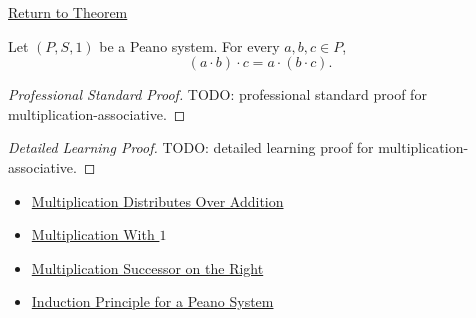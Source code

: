 \newpage
{}
\label{prf:multiplication-associative}

\begin{remark*}[Return]
\hyperref[thm:multiplication-associative]{Return to Theorem}
\end{remark*}

\begin{theorem*}
Let $(P,S,1)$ be a Peano system. For every $a,b,c \in P$,
\[
(a \cdot b) \cdot c = a \cdot (b \cdot c).
\]
\end{theorem*}

\begin{proof}[Professional Standard Proof]
\LRAProofBodyStart
TODO: professional standard proof for multiplication-associative.
\end{proof}

\begin{proof}[Detailed Learning Proof]
\LRAProofBodyStart
TODO: detailed learning proof for multiplication-associative.
\end{proof}

\begin{remark*}
\end{remark*}

\begin{dependencies}
\begin{itemize}
  \item \hyperref[thm:multiplication-distributes-over-addition]{Multiplication Distributes Over Addition}
  \item \hyperref[thm:multiplication-with-one]{Multiplication With $1$}
  \item \hyperref[thm:multiplication-successor-on-right]{Multiplication Successor on the Right}
  \item \hyperref[thm:induction-principle-for-peano-system]{Induction Principle for a Peano System}
\end{itemize}
\end{dependencies}

\clearpage
